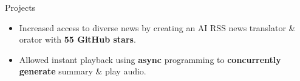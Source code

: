 \documentclass{resume} %
\begin{document}
\begin{workSection}{Projects}
	\customItem[
		title=\href{https://github.com/AshkanArabim/newsbridge}{Newsbridge (news.ashkan.zone) \faExternalLink},
		technologies= | FastAPI{,} React{,} Postgres{,} JavaScript{,} Docker{,} Ollama{,} Gemini API,
		duration=%
	]
	\begin{itemize}
		\vspace{-0.5em}
		\itemsep -6pt {}
		\item Increased access to diverse news by creating an AI RSS news translator \& orator with \textbf{55 GitHub stars}.
		\item Allowed instant playback using \textbf{async} programming to \textbf{concurrently generate} summary \& play audio.
	\end{itemize}
	

\end{workSection}
\end{document}
